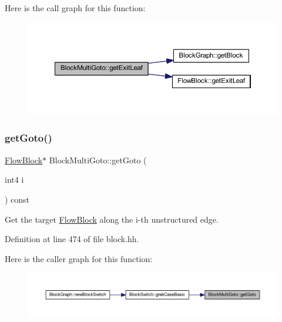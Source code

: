 Here is the call graph for this function\+:
\nopagebreak
\begin{figure}[H]
\begin{center}
\leavevmode
\includegraphics[width=350pt]{class_block_multi_goto_a54ba810882911521ff2ca84b6458228a_cgraph}
\end{center}
\end{figure}
\mbox{\label{class_block_multi_goto_ae4bd0a4f2da98b84b96b1a9ec97b46e3}} 
\subsubsection{\texorpdfstring{getGoto()}{getGoto()}}
{\footnotesize\ttfamily \mbox{\hyperlink{class_flow_block}{Flow\+Block}}$\ast$ Block\+Multi\+Goto\+::get\+Goto (\begin{DoxyParamCaption}\item[{int4}]{i }\end{DoxyParamCaption}) const\hspace{0.3cm}{\ttfamily [inline]}}



Get the target \mbox{\hyperlink{class_flow_block}{Flow\+Block}} along the i-\/th unstructured edge. 



Definition at line 474 of file block.\+hh.

Here is the caller graph for this function\+:
\nopagebreak
\begin{figure}[H]
\begin{center}
\leavevmode
\includegraphics[width=350pt]{class_block_multi_goto_ae4bd0a4f2da98b84b96b1a9ec97b46e3_icgraph}
\end{center}
\end{figure}
\mbox{\label{class_block_multi_goto_a9fd5bfdaa3202a1cd604213c2be88bf2}} 
